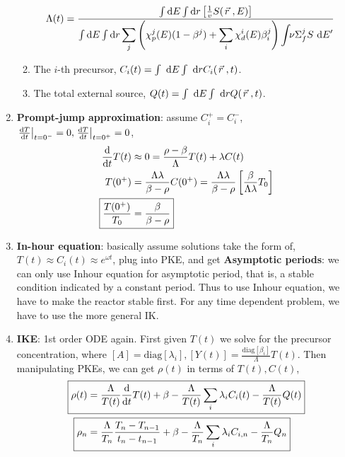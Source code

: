 \documentclass{school-22.211-notes}
\begin{document}
\begin{enumerate}
\begin{enumerate}
        \begin{align}
          \Lambda (t) &= \frac{\int \bsp \dE \int \bsp  \dr \left[ \frac{1}{v} S(\vecr, E) \right] }{\int \bsp \dE \int \bsp \dr \Sum_j \left( \chi_p^j (E) (1-\beta^j) + \Sum_i \chi_d^i (E) \beta_i^j \right) \int \bsp \nu \Sigma_f^j S \dE'} 
        \end{align}

      \item The $i$-th precursor, $C_i (t) = \int \mbox{ }\mathrm{d} E \int \mbox{ }\mathrm{d} r C_i (\left.\vec{r}\right., t)$. 

      \item The total external source, $Q(t) = \int \mbox{ }\mathrm{d} E \int \mbox{ }\mathrm{d} r Q (\left.\vec{r}\right., t)$. 
      \end{enumerate}

    \item \textbf{Prompt-jump approximation}: assume $C_i^+ = C_i^-$, $\left. \frac{\mathrm{d}T}{\mathrm{d}t} \right|_{t = 0^-} = 0, \left. \frac{\mathrm{d}T}{\mathrm{d}t} \right|_{t = 0^+} = 0$, 
      \begin{align}
        \ddt T(t) &\approx 0 = \frac{\rho - \beta}{\Lambda} T(t) + \lambda C(t) \\
        T(0^+) &= \frac{\Lambda \lambda}{\beta - \rho} C(0^+) = \frac{\Lambda \lambda}{\beta - \rho} \left[ \frac{\beta}{\Lambda \lambda} T_0 \right] \\
        \Aboxed{ \frac{T(0^+)}{T_0} &= \frac{\beta}{\beta - \rho} }
      \end{align}

    \item \textbf{In-hour equation}: basically assume solutions take the form of, $T(t) \approx C_i (t) \approx e^{\omega t}$, plug into PKE, and get
      \textbf{Asymptotic periods}: we can only use Inhour equation for asymptotic period, that is, a stable condition indicated by a constant period. Thus to use Inhour equation, we have to make the reactor stable first. For any time dependent problem, we have to use the more general IK. 

\item \textbf{IKE}: 1st order ODE again. First given $T(t)$ we solve for the precursor concentration,
where $[A] = \mathrm{diag}[\lambda_i], [Y(t)] = \frac{\mathrm{diag}[\beta_i]}{\Lambda} T(t)$. Then manipulating PKEs, we can get $\rho(t)$ in terms of $T(t), C(t)$, 
\begin{align}
\Aboxed{\rho(t) &= \frac{\Lambda}{T(t)} \ddt T(t) + \beta - \frac{\Lambda}{T(t)} \Sum_i \lambda_i C_i(t) - \frac{\Lambda}{T(t)} Q(t) } \\
\Aboxed{ \rho_n &= \frac{\Lambda}{T_n} \frac{T_n - T_{n-1}}{t_n - t_{n-1}} + \beta - \frac{\Lambda}{T_n} \Sum_i \lambda_i C_{i,n} - \frac{\Lambda}{T_n} Q_n } 
\end{align}
\end{enumerate}
\end{document}

